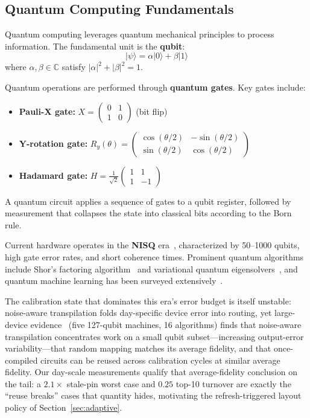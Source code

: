 ﻿\documentclass[12pt,a4paper]{article}
\begin{document}
\subsection{Quantum Computing Fundamentals}

Quantum computing leverages quantum mechanical principles to process information. The fundamental unit is the \textbf{qubit}:
\begin{equation}
    |\psi\rangle = \alpha|0\rangle + \beta|1\rangle
\end{equation}
where $\alpha, \beta \in \mathbb{C}$ satisfy $|\alpha|^2 + |\beta|^2 = 1$.

Quantum operations are performed through \textbf{quantum gates}. Key gates include:
\begin{itemize}
    \item \textbf{Pauli-X gate:} $X = \begin{pmatrix} 0 & 1 \\ 1 & 0 \end{pmatrix}$ (bit flip)
    \item \textbf{Y-rotation gate:} $R_y(\theta) = \begin{pmatrix} \cos(\theta/2) & -\sin(\theta/2) \\ \sin(\theta/2) & \cos(\theta/2) \end{pmatrix}$
    \item \textbf{Hadamard gate:} $H = \frac{1}{\sqrt{2}}\begin{pmatrix} 1 & 1 \\ 1 & -1 \end{pmatrix}$
\end{itemize}

A quantum circuit applies a sequence of gates to a qubit register, followed by measurement that collapses the state into classical bits according to the Born rule.

Current hardware operates in the \textbf{NISQ} era~\cite{preskill2018}, characterized by 50--1000 qubits, high gate error rates, and short coherence times. Prominent quantum algorithms include Shor's factoring algorithm~\cite{shor1994} and variational quantum eigensolvers~\cite{kandala2017}, and quantum machine learning has been surveyed extensively~\cite{biamonte2017,cerezo2021}.

The calibration state that dominates this era's error budget is itself unstable: noise-aware transpilation folds day-specific device error into routing, yet large-device evidence~\cite{huowei2025} (five 127-qubit machines, 16 algorithms) finds that noise-aware transpilation concentrates work on a small qubit subset---increasing output-error variability---that random mapping matches its average fidelity, and that once-compiled circuits can be reused across calibration cycles at similar average fidelity. Our day-scale measurements qualify that average-fidelity conclusion on the tail: a $2.1\times$ stale-pin worst case and $0.25$ top-10 turnover are exactly the ``reuse breaks'' cases that quantity hides, motivating the refresh-triggered layout policy of Section~\ref{sec:adaptive}.
\end{document}
